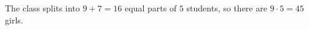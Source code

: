 The class splits into $9+7=16$ equal parts of $5$ students, so there are $9\cdot5=\boxed{45}$ girls.
